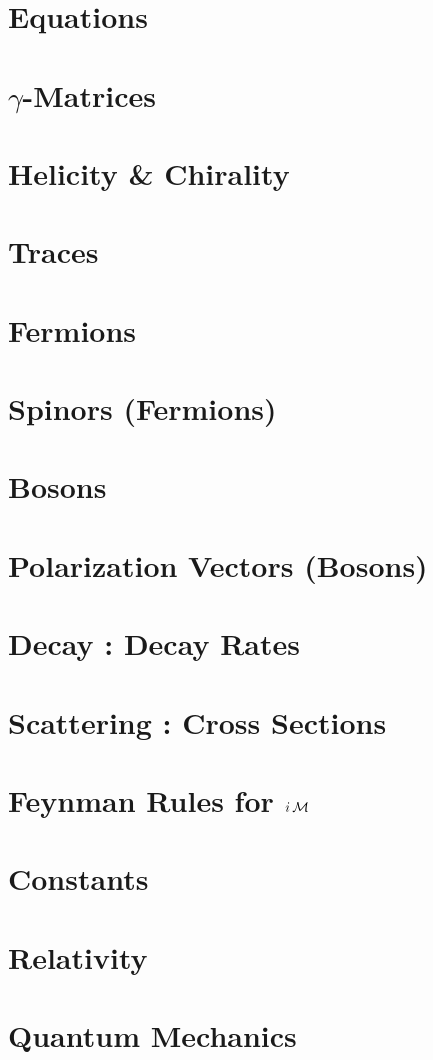 \documentclass[landscape,8pt,a4paper,english]{extarticle}
\begin{document}
\begin{multicols*}{3}\centering
        \section*{Equations}
        \section*{$\gamma$-Matrices}
        \section*{Helicity \& Chirality}
        \section*{Traces}
        \section*{Fermions}
        \section*{Spinors (Fermions)}
        \section*{Bosons}
        \section*{Polarization Vectors (Bosons)}
        \section*{Decay : Decay Rates}
        \section*{Scattering : Cross Sections}
        \section*{Feynman Rules for $i\operatorname{\mathcal{M}}$}
        \section*{Constants}
        \section*{Relativity}
        \section*{Quantum Mechanics}
\end{multicols*}
\end{document}
